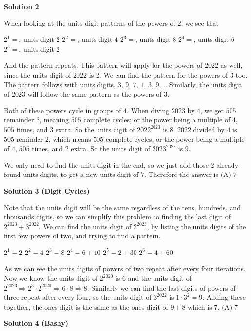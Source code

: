 \begin{enumerate}
\textbf{Solution 2}

When looking at the units digit patterns of the powers of $2$, we see that 

 $2^1=$,  units digit $2$
$2^2=$,  units digit $4$
$2^3=$,  units digit $8$
$2^4=$,  units digit $6$
$2^5=$,  units digit $2$

 And the pattern repeats. This pattern will apply for the powers of $2022$ as well, since the units digit of $2022$ is $2$. We can find the pattern for the powers of $3$ too. The pattern follows with units digits, $3$, $9$, $7$, $1$, $3$, $9$, ...Similarly, the units digit of $2023$ will follow the same pattern as the powers of $3$. 

 Both of these powers cycle in groups of $4$. When diving $2023$ by $4$, we get $505$ remainder $3$, meaning $505$ complete cycles; or the power being a multiple of $4$,  $505$ times, and $3$ extra. So the units digit of $2022^{2023}$ is $8$. $2022$ divided by $4$ is $505$ reminder $2$, which means $505$ complete cycles, or the power being a multiple of $4$,  $505$ times, and $2$ extra. So the units digit of $2023^{2022}$ is $9$.

 We only need to find the units digit in the end, so we just add those $2$ already found units digits, to get a new units digit of $7$. Therefore the answer is $\boxed{\text{(A) 7}}$




\textbf{Solution 3 (Digit Cycles)}

Note that the units digit will be the same regardless of the tens, hundreds, and thousands digits, so we can simplify this problem to finding the last digit of $2^{2023} + 3^{2022}$. We can find the units digit of $2^{2023}$, by listing the units digits of the first few powers of two, and trying to find a pattern. 

 $2^1=2$
$2^2=4$
$2^3=8$
$2^4=6+10$
$2^5=2+30$
$2^6=4+60$

 As we can see the units digits of powers of two repeat after every four iterations. Now we know the units digit of $2^{2020}$ is $6$ and the units digit of $2^{2023} \Rightarrow 2^3\cdot 2^{2020} \Rightarrow 6\cdot 8 \Rightarrow 8$. Similarly we can find the last digits of powers of three repeat after every four, so the units digit of $3^{2022}$ is $1\cdot 3^2 = 9$. Adding these together, the ones digit is the same as the ones digit of $9+8$ which is $7$. $\boxed{\text{(A) 7}}$




\textbf{Solution 4 (Bashy)}


\end{enumerate}
